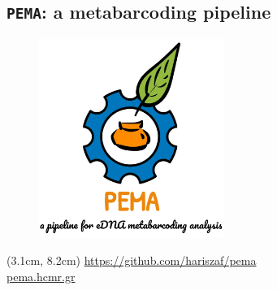 \documentclass{beamer}
\begin{document}
   \begin{darkframes}

      \section{\texttt{PEMA}: a metabarcoding pipeline}

      \begin{frame}

         \begin{figure}
            \centering
            \includegraphics[width=60mm]{resources/pema_logo.png}         
         \end{figure} 

         \begin{textblock*}{7cm}(3.1cm, 8.2cm)
            \centering
            \href{https://github.com/hariszaf/pema}{https://github.com/hariszaf/pema} \\ 
            \href{http://pema.hcmr.gr}{pema.hcmr.gr}
         \end{textblock*}


      \end{frame}

   \end{darkframes}
\end{document}
